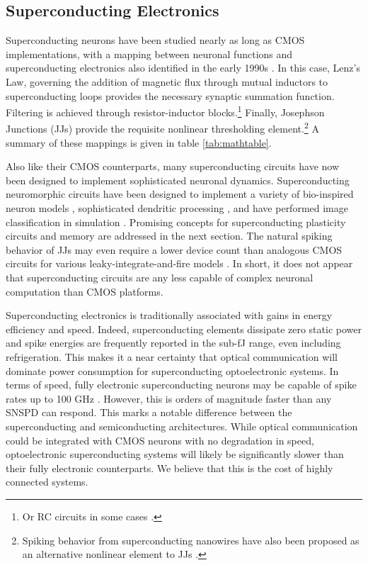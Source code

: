 \documentclass[twocolumn]{article}
\begin{document}
\subsection{Superconducting Electronics}
Superconducting neurons have been studied nearly as long as CMOS implementations, with a mapping between neuronal functions and superconducting electronics also identified in the early 1990s \cite{hago1991, hiak1991}. In this case, Lenz's Law, governing the addition of magnetic flux through mutual inductors to superconducting loops provides the necessary synaptic summation function. Filtering is achieved through resistor-inductor blocks.\footnote{Or RC circuits in some cases \cite{crotty2010josephson}.} Finally, Josephson Junctions (JJs) provide the requisite nonlinear thresholding element.\footnote{Spiking behavior from superconducting nanowires have also been proposed as an alternative nonlinear element to JJs \cite{toomey2019design}.} A summary of these mappings is given in table \ref{tab:mathtable}. 

Also like their CMOS counterparts, many superconducting circuits have now been designed to implement sophisticated neuronal dynamics. Superconducting neuromorphic circuits have been designed to implement a variety of bio-inspired neuron models \cite{crotty2010josephson, toomey2019design, schneider2018tutorial}, sophisticated dendritic processing \cite{shainline2019fluxonic}, and have performed image classification in simulation \cite{schneider2017energy}. Promising concepts for superconducting plasticity circuits and memory are addressed in the next section. The natural spiking behavior of JJs may even require a lower device count than analogous CMOS circuits for various leaky-integrate-and-fire models \cite{crotty2010josephson}. In short, it does not appear that superconducting circuits are any less capable of complex neuronal computation than CMOS platforms.

Superconducting electronics is traditionally associated with gains in energy efficiency and speed. Indeed, superconducting elements dissipate zero static power and spike energies are frequently reported in the sub-fJ range, even including refrigeration. This makes it a near certainty that optical communication will dominate power consumption for superconducting optoelectronic systems. In terms of speed, fully electronic superconducting neurons may be capable of spike rates up to 100 GHz \cite{schneider2017energy, schneider2018tutorial}. However, this is orders of magnitude faster than any SNSPD can respond. This marks a notable difference between the superconducting and semiconducting architectures. While optical communication could be integrated with CMOS neurons with no degradation in speed, optoelectronic superconducting systems will likely be significantly slower than their fully electronic counterparts.  We believe that this is the cost of highly connected systems.
\end{document}
